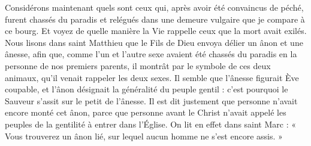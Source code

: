  Considérons maintenant quels sont ceux qui, après avoir été convaincus de péché, furent chassés du paradis et relégués dans une demeure vulgaire que je compare à ce bourg. Et voyez de quelle manière la Vie rappelle ceux que la mort avait exilés. Nous lisons dans saint Matthieu que le Fils de Dieu envoya délier un ânon et une ânesse, afin que, comme l’un et l’autre sexe avaient été chassés du paradis en la personne de nos premiers parents, il montrât par le symbole de ces deux animaux, qu’il venait rappeler les deux sexes. Il semble que l’ânesse figurait Ève coupable, et l’ânon désignait la généralité du peuple gentil : c’est pourquoi le Sauveur s’assit sur le petit de l’ânesse. Il est dit justement que personne n’avait encore monté cet ânon, parce que personne avant le Christ n’avait appelé les peuples de la gentilité à entrer dans l’Église. On lit en effet dans saint Marc : « Vous trouverez un ânon lié, sur lequel aucun homme ne s’est encore assis. »